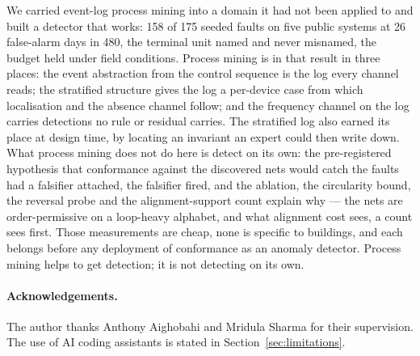 \documentclass[runningheads]{llncs}
\begin{document}
We carried event-log process mining into a domain it had not been applied to and built a detector that works: 158 of 175 seeded faults on five public systems at 26 false-alarm days in 480, the terminal unit named and never misnamed, the budget held under field conditions. Process mining is in that result in three places: the event abstraction from the control sequence is the log every channel reads; the stratified structure gives the log a per-device case from which localisation and the absence channel follow; and the frequency channel on the log carries detections no rule or residual carries. The stratified log also earned its place at design time, by locating an invariant an expert could then write down. What process mining does not do here is detect on its own: the pre-registered hypothesis that conformance against the discovered nets would catch the faults had a falsifier attached, the falsifier fired, and the ablation, the circularity bound, the reversal probe and the alignment-support count explain why --- the nets are order-permissive on a loop-heavy alphabet, and what alignment cost sees, a count sees first. Those measurements are cheap, none is specific to buildings, and each belongs before any deployment of conformance as an anomaly detector. Process mining helps to get detection; it is not detecting on its own.

\paragraph{Acknowledgements.}
The author thanks Anthony Aighobahi and Mridula Sharma for their supervision.
The use of AI coding assistants is stated in Section~\ref{sec:limitations}.



\end{document}
